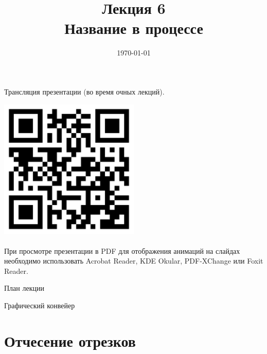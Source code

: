 \documentclass[10pt]{beamer}
\date{\today}
\title{Лекция 6 \\Название в процессе}
\begin{document}
 		 


\newcommand \abs[1] {\left| #1 \right|}

    
    \begin{frame}[plain]
    	
    	
    	\centering
    	Трансляция презентации (во время очных лекций).     
    		
    	\includegraphics[width=0.5\textwidth, keepaspectratio]{qr.png} \\ ~ \\
    	
    	
    	При просмотре презентации в PDF для отображения анимаций на слайдах необходимо использовать Acrobat Reader, KDE Okular, PDF-XChange или Foxit Reader.

    \end{frame}
	
	
	\frame{\maketitle}
	
	
	
	\begin{frame}{План лекции}
		\tableofcontents
	\end{frame}
	
	\begin{frame}{Графический конвейер}
		
	\end{frame}
	
	
	\section{Отчесение отрезков}	
	\frame{\sectionpage}
	
\end{document}
